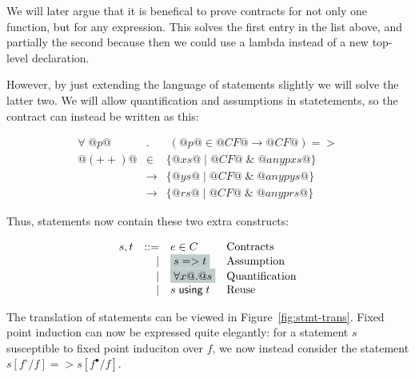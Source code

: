 We will later argue that it is benefical to prove contracts for not
only one function, but for any expression. This solves the first entry
in the list above, and partially the second because then we could use
a lambda instead of a new top-level declaration.

However, by just extending the language of statements slightly we will
solve the latter two. We will allow quantification and assumptions in
statetements, so the contract can instead be written as this:

\[\begin{array}{rcl}
\forall \; @p@ \; & . & \; (@p@ \in @CF@ \to @CF@) => \\
@(++)@ & \in & \{ @xs@ \mid @CF@ \; \& \; @any p xs@ \} \\
       & \to & \{ @ys@ \mid @CF@ \; \& \; @any p ys@ \} \\
       & \to & \{ @rs@ \mid @CF@ \; \& \; @any p rs@ \}
\end{array}\]

Thus, statements now contain these two extra constructs:

\[\begin{array}{lrll}
  s,t & ::=  & e \in C                     & \text{Contracts} \\
      & \mid & \highlight{s => t}          & \text{Assumption} \\
      & \mid & \highlight{\forall x @.@ s} & \text{Quantification} \\
      & \mid & s \; \textsf{using} \; t    & \text{Reuse}
\end{array}\]

The translation of statements can be viewed in
Figure~\ref{fig:stmt-trans}.  Fixed point induction can now be
expressed quite elegantly: for a statement $s$ susceptible to fixed
point induciton over $f$, we now instead consider the statement
$s[f^\circ/f] => s[f^\bullet/f]$.

